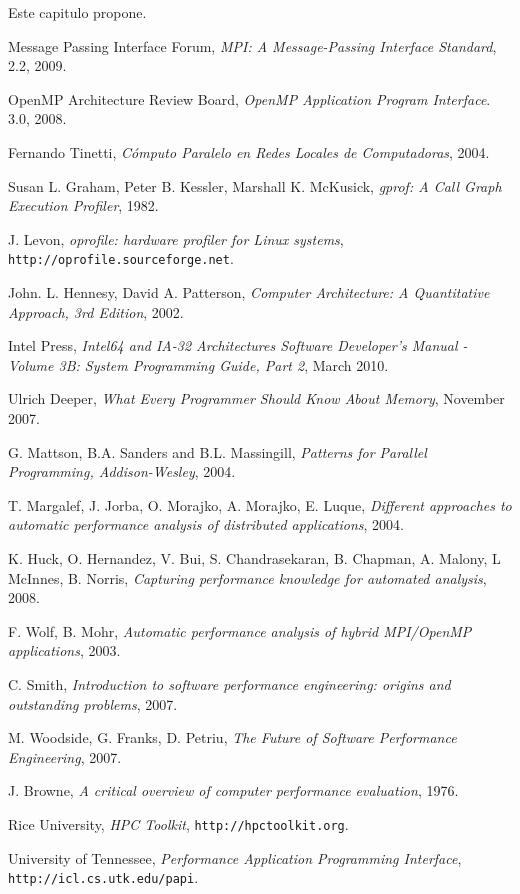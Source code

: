 \documentclass[a4paper]{report}
\begin{document}
Este capitulo propone.

\begin{thebibliography}{9}
  
  Message Passing Interface Forum,
  \emph{MPI: A Message-Passing Interface Standard},
  2.2,
  2009.

  OpenMP Architecture Review Board,
  \emph{OpenMP Application Program Interface}.
  3.0,
  2008.

  Fernando Tinetti,
  \emph{C\'omputo Paralelo en Redes Locales de Computadoras},
  2004.

 Susan L. Graham,  Peter B. Kessler,  Marshall K. McKusick,
 \emph{gprof: A Call Graph Execution Profiler},
 1982.

J. Levon,
\emph{oprofile: hardware profiler for Linux systems},
{\tt http://oprofile.sourceforge.net}.

 John. L. Hennesy, David A. Patterson,
 \emph{Computer Architecture: A Quantitative Approach, 3rd Edition},
 2002.

 Intel Press,
 \emph{Intel64 and IA-32 Architectures Software Developer's Manual - Volume 3B: System Programming Guide, Part 2},
 March 2010.

 Ulrich Deeper,
 \emph{What Every Programmer Should Know About Memory},
 November 2007.

 G. Mattson, B.A. Sanders and B.L. Massingill, 
 \emph{Patterns for Parallel Programming, Addison-Wesley},
 2004.

 T. Margalef, J. Jorba, O. Morajko, A. Morajko, E. Luque,
 \emph{Different approaches to automatic performance analysis of distributed applications},
 2004.

 K. Huck, O. Hernandez, V. Bui, S. Chandrasekaran, B. Chapman, A. Malony, L McInnes, B. Norris,
 \emph{Capturing performance knowledge for automated analysis},
 2008.

 F. Wolf, B. Mohr,
 \emph{Automatic performance analysis of hybrid MPI/OpenMP applications},
 2003.

 C. Smith,
 \emph{Introduction to software performance engineering: origins and outstanding problems},
 2007.

 M. Woodside, G. Franks, D. Petriu,
 \emph{The Future of Software Performance Engineering},
 2007.

 J. Browne,
 \emph{A critical overview of computer performance evaluation},
 1976.

  Rice University,
 \emph{HPC Toolkit},
 {\tt http://hpctoolkit.org}.

  University of Tennessee,
  \emph{Performance Application Programming Interface},
  {\tt http://icl.cs.utk.edu/papi}.

\end{thebibliography}
\end{document}
